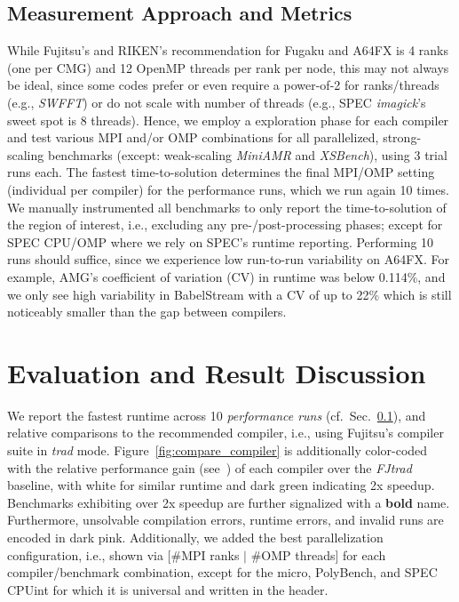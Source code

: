 \documentclass[conference,compsoc]{IEEEtran}
\begin{document}
\subsection{Measurement Approach and Metrics}\label{sec:metho:measure}
While Fujitsu's and RIKEN's recommendation for Fugaku and A64FX is 4 ranks (one per CMG) and 12 OpenMP threads per rank per node, this
may not always be ideal, since some codes prefer or even require a power-of-2 for ranks/threads (e.g.,
\textit{SWFFT}) or do not scale with number of threads (e.g., SPEC \textit{imagick}'s sweet
spot is 8 threads). Hence, we employ a exploration phase for each compiler and test various
MPI and/or OMP combinations for all parallelized, strong-scaling benchmarks
(except: weak-scaling \textit{MiniAMR} and \textit{XSBench}), using 3 trial runs each.
The fastest time-to-solution determines the final MPI/OMP setting (individual per compiler) for the
performance runs, which we run again 10 times.
We manually instrumented all benchmarks to only report the time-to-solution of the region
of interest, i.e., excluding any pre-/post-processing phases; except for SPEC CPU/OMP where
we rely on SPEC's runtime reporting. Performing 10 runs should suffice, since we experience
low run-to-run variability on A64FX. For example, AMG's coefficient of variation (CV) in runtime was
below 0.114\%, and we only see high variability in BabelStream with a CV of up to 22\% which is still
noticeably smaller than the gap between compilers.

\section{Evaluation and Result Discussion}\label{sec:eval}
We report the fastest runtime across 10 \textit{performance runs}
(cf.~Sec.~\ref{sec:metho:measure}), and relative comparisons to the recommended compiler, i.e.,
using Fujitsu's compiler suite in \textit{trad} mode. Figure~\ref{fig:compare_compiler} is
additionally color-coded with the relative performance gain (see~\cite{hoefler_scientific_2015}) of each
compiler over the \textit{FJtrad} baseline, with white for similar runtime and dark green
indicating 2x speedup.  Benchmarks exhibiting over 2x speedup are further signalized with a \textbf{bold} name.
Furthermore, unsolvable compilation errors, runtime errors, and invalid runs are encoded in dark pink.
Additionally, we added the best parallelization configuration, i.e., shown via [\#MPI ranks $|$ \#OMP threads]
for each compiler/benchmark combination, except for the micro, PolyBench, and SPEC CPUint for which it is
universal and written in the header.
\end{document}
